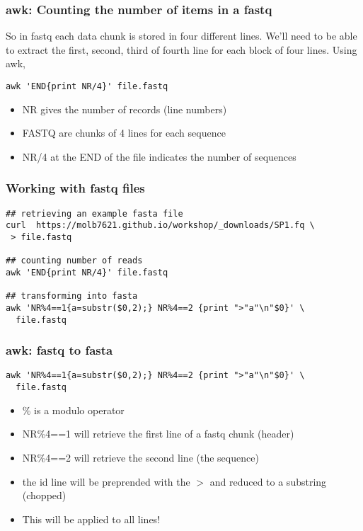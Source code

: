 \documentclass{beamer}
\begin{document}
\begin{frame}[fragile]
  \frametitle{awk: Counting the number of items in a fastq}

So in fastq each data chunk is stored in four different lines. We'll need to be able to extract the first, second, third of fourth line for each block of four lines. Using awk,

\begin{verbatim}
awk 'END{print NR/4}' file.fastq
\end{verbatim}
\begin{itemize}
  
  \item NR gives the number of records (line numbers)
  \item FASTQ are chunks of 4 lines for each sequence
  \item NR/4 at the END of the file indicates the number of sequences
  \end{itemize}
\end{frame}



\begin{frame}[fragile]
  \frametitle{Working with fastq files}
\begin{small}
\begin{verbatim}
## retrieving an example fasta file
curl  https://molb7621.github.io/workshop/_downloads/SP1.fq \
 > file.fastq

## counting number of reads
awk 'END{print NR/4}' file.fastq

## transforming into fasta
awk 'NR%4==1{a=substr($0,2);} NR%4==2 {print ">"a"\n"$0}' \
  file.fastq

\end{verbatim}
\end{small}
\end{frame}


\begin{frame}[fragile]
  \frametitle{awk: fastq to fasta}
\begin{small}
\begin{verbatim}
awk 'NR%4==1{a=substr($0,2);} NR%4==2 {print ">"a"\n"$0}' \
  file.fastq
\end{verbatim}
\end{small}
  \begin{itemize}
  \item \% is a modulo operator
  \item NR\%4==1 will retrieve the first line of a fastq chunk (header)
  \item NR\%4==2 will retrieve the second line (the sequence)
  \item the id line will be preprended with the $>$ and reduced to a substring (chopped)
  \item This will be applied to all lines!

  \end{itemize}
\end{frame}
\end{document}
